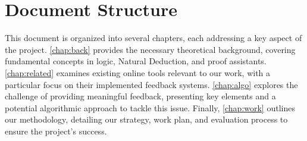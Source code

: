 \color{red}
\section{Document Structure}

This document is organized into several chapters, each addressing a key aspect of the project. \autoref{chap:back} provides the necessary theoretical background, covering fundamental concepts in logic, Natural Deduction, and proof assistants. \autoref{chap:related} examines existing online tools relevant to our work, with a particular focus on their implemented feedback systems. \autoref{chap:algo} explores the challenge of providing meaningful feedback, presenting key elements and a potential algorithmic approach to tackle this issue. Finally, \autoref{chap:work} outlines our methodology, detailing our strategy, work plan, and evaluation process to ensure the project's success.

\endgroup

